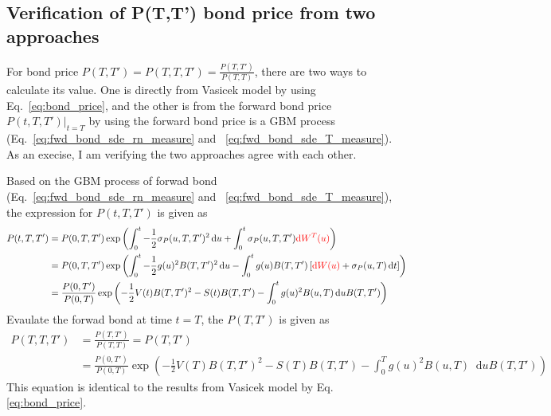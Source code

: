 \documentclass[12pt]{article}
\newcommand{\dd}{\mathop{}\!\text{d}}
\newcommand{\qBrownian}[1]{W(#1)}
\newcommand{\tBrownian}[1]{W^{T}(#1)}
\newcommand{\sigmaP}{\sigma_P}
\begin{document}
\begin{appendices}
\label{sec:bond_price_change_of_measure_verification}
\subsection{Verification of P(T,T') bond price from two approaches}
For bond price $P(T, T') = P(T, T, T') = \frac{P(T, T')}{P(T, T)}$, there are two
ways to calculate its value. One is directly from Vasicek model by
using Eq.~\ref{eq:bond_price}, and the other is from the forward bond price
$\left. P(t, T, T') \right \vert_{t=T}$ by using the forward bond price is a GBM process
(Eq.~\ref{eq:fwd_bond_sde_rn_measure} and ~\ref{eq:fwd_bond_sde_T_measure}).
As an execise, I am verifying the two approaches
agree with each other.

Based on the GBM process of forwad bond (Eq.~\ref{eq:fwd_bond_sde_rn_measure} and
~\ref{eq:fwd_bond_sde_T_measure}), the expression for $P(t, T, T')$ is given as
\begin{align}
    P(t, T, T') &= P(0, T, T') \exp\left(
        \int_0^t -\frac{1}{2} \sigmaP(u, T, T')^2 \dd u +
            \int_0^t \sigmaP(u, T, T') {\color{red} \dd \tBrownian{u} }
        \right) \\
        &= P(0, T, T') \exp\left(
        \int_0^t -\frac{1}{2} g(u)^2 B(T,T')^2 \dd u -
            \int_0^t g(u) B(T,T')  \left[ 
                {\color{red}\dd \qBrownian{u}} + \sigmaP(u, T) \dd t
                \right]
        \right) \\
        &= \frac{P(0, T')}{P(0, T)} \exp \left(
        -\frac{1}{2} V(t) B(T,T')^2 - S(t) B(T,T') - \int_0^t g(u)^2 B(u, T) \dd u B(T, T')
        \right)
\end{align}
Evaulate the forwad bond at time $t = T$, the $P(T, T')$ is given as
\begin{align}
     P(T, T, T')  &= \frac{P(T, T')}{P(T, T)} = P(T, T') \\
     &= \frac{P(0, T')}{P(0, T)} \exp \left(
        -\frac{1}{2} V(T) B(T,T')^2 - S(T) B(T,T') - \int_0^T g(u)^2 B(u, T) \dd u B(T, T')
        \right)
\end{align}
This equation is identical to the results from Vasicek model by Eq.\ref{eq:bond_price}.

\label{sec:vasicek_AB_implementation}

\end{appendices}
\end{document}
